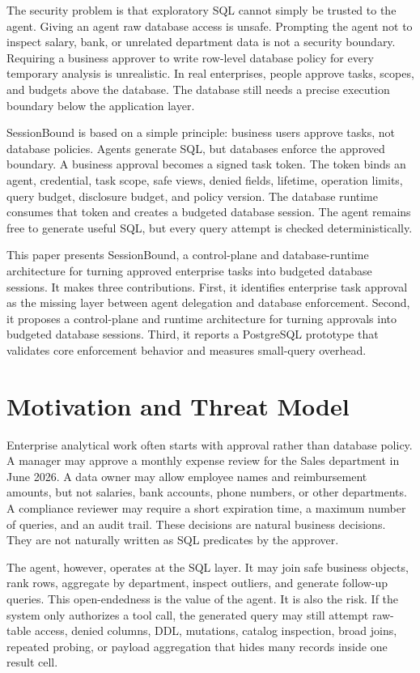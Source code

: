 \documentclass[10pt,twocolumn]{article}
\begin{document}
The security problem is that exploratory SQL cannot simply be trusted to
the agent. Giving an agent raw database access is unsafe. Prompting the
agent not to inspect salary, bank, or unrelated department data is not a
security boundary. Requiring a business approver to write row-level
database policy for every temporary analysis is unrealistic. In real
enterprises, people approve tasks, scopes, and budgets above the
database. The database still needs a precise execution boundary below
the application layer.

SessionBound is based on a simple principle: business users approve
tasks, not database policies. Agents generate SQL, but databases enforce
the approved boundary. A business approval becomes a signed task token.
The token binds an agent, credential, task scope, safe views, denied
fields, lifetime, operation limits, query budget, disclosure budget, and
policy version. The database runtime consumes that token and creates a
budgeted database session. The agent remains free to generate useful
SQL, but every query attempt is checked deterministically.

This paper presents SessionBound, a control-plane and database-runtime
architecture for turning approved enterprise tasks into budgeted
database sessions. It makes three contributions. First, it identifies
enterprise task approval as the missing layer between agent delegation
and database enforcement. Second, it proposes a control-plane and
runtime architecture for turning approvals into budgeted database
sessions. Third, it reports a PostgreSQL prototype that validates core
enforcement behavior and measures small-query overhead.

\section{Motivation and Threat Model}

Enterprise analytical work often starts with approval rather than
database policy. A manager may approve a monthly expense review for the
Sales department in June 2026. A data owner may allow employee names and
reimbursement amounts, but not salaries, bank accounts, phone numbers,
or other departments. A compliance reviewer may require a short
expiration time, a maximum number of queries, and an audit trail. These
decisions are natural business decisions. They are not naturally written
as SQL predicates by the approver.

The agent, however, operates at the SQL layer. It may join safe business
objects, rank rows, aggregate by department, inspect outliers, and
generate follow-up queries. This open-endedness is the value of the
agent. It is also the risk. If the system only authorizes a tool call,
the generated query may still attempt raw-table access, denied columns,
DDL, mutations, catalog inspection, broad joins, repeated probing, or
payload aggregation that hides many records inside one result cell.
\end{document}
